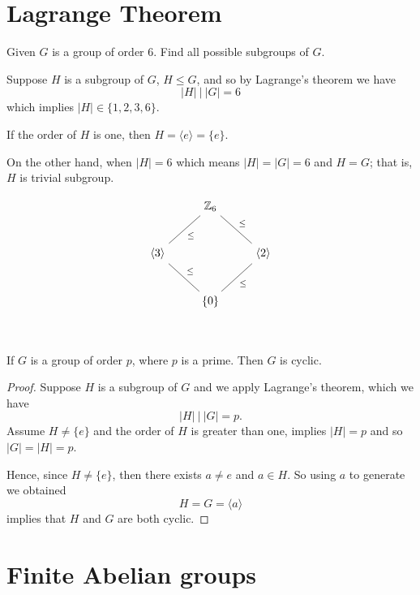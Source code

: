 \section{Lagrange Theorem}

\begin{example}
    Given $G$ is a group of order 6. Find all possible subgroups of $G$.
\end{example}
\begin{solution}
    Suppose $H$ is a subgroup of $G$, $H \leq G$, and so by Lagrange's theorem we have 
    \[
        |H| \> \big \vert \> |G| = 6
    \]
    which implies $|H| \in \{1, 2, 3, 6\}$.

    If the order of $H$ is one, then $H = \langle e \rangle = \{ e \}$.

    On the other hand, when $|H| = 6$ which means $|H| = |G| = 6$ and $H = G$; that is, $H$ is trivial subgroup.

    \[
        \begin{tikzcd}[row sep=2.5em]
            & \mathbb{Z}_6 \arrow[dash, "\leq"]{dl} \arrow[dash, "\leq"]{dr} & \\
            \langle 3 \rangle \arrow[dash, "\leq"]{dr}&  & \langle 2 \rangle \arrow[dash, "\leq"]{dl}\\
            & \{ 0 \} &\\
        \end{tikzcd}
    \]
\end{solution}

\begin{theorem}
    If $G$ is a group of order $p$, where $p$ is a prime. Then $G$ is cyclic.
\end{theorem}
\begin{proof}
    Suppose $H$ is a subgroup of $G$ and we apply Lagrange's theorem, which we have 
    \[
        |H| \> \big \vert \> |G| = p.
    \]
    Assume $H \neq \{ e \}$ and the order of $H$ is greater than one, implies $|H| = p$ and so $|G| = |H| = p$.

    Hence, since $H \neq \{ e \}$, then there exists $a \neq e$ and $a \in H$. So using $a$ to generate we obtained
    \[
        H = G = \langle a \rangle
    \]
    implies that $H$ and $G$ are both cyclic.
\end{proof}

\section{Finite Abelian groups}

